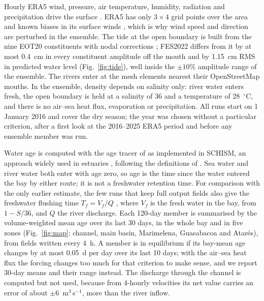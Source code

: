 \documentclass[a4paper,fleqn]{ems-dc}
\begin{document}
Hourly ERA5 wind, pressure, air temperature, humidity, radiation and precipitation drive the
surface \citep{Hersbach2020}. ERA5 has only $3 \times 4$ grid points over the area and known
biases in its surface winds \citep{BelmonteRivas2019}, which is why wind speed and direction
are perturbed in the ensemble. The tide at the open boundary is built from the nine EOT20
constituents with nodal corrections \citep{Pugh2014}; FES2022 differs from it by at most
0.4~cm in every constituent amplitude off the mouth and by 1.15~cm RMS in predicted water
level (Fig.~\ref{fig:tide}), well inside the $\pm10\%$ amplitude range of the ensemble. The
rivers enter at the mesh elements nearest their OpenStreetMap mouths. In the ensemble,
density depends on salinity only: river water enters fresh, the open boundary is held at a
salinity of 36 and a temperature of 28~$^\circ$C, and there is no air--sea heat flux,
evaporation or precipitation. All runs start on 1 January 2016 and cover the dry season; the
year was chosen without a particular criterion, after a first look at the 2016--2025 ERA5
period and before any ensemble member was run.

Water age is computed with the age tracer of \citet{Deleersnijder2001} \citep[see
also][]{Delhez1999} as implemented in SCHISM, an approach widely used in estuaries
\citep{Shen2004}, following the definitions of \citet{Monsen2002}. Sea water and river water
both enter with age zero, so age is the time since the water entered the bay by either
route; it is not a freshwater retention time. For comparison with the only earlier estimate,
the few runs that keep full output fields also give the freshwater flushing time
$T_f = V_f/Q$ \citep{Alber1999,Sheldon2002}, where $V_f$ is the fresh water in the bay, from
$1 - S/36$, and $Q$ the river discharge. Each 120-day member is summarised by the
volume-weighted mean age over its last 30 days, in the whole bay and in five zones
(Fig.~\ref{fig:map}: channel, main basin, Marimelena, Guasabacoa and Atar\'es), from fields
written every 4~h. A member is in equilibrium if its bay-mean age changes by at most 0.05~d per day over
its last 10 days; with the air--sea heat flux the forcing changes too much for that
criterion to make sense, and we report 30-day means and their range instead. The discharge
through the channel is computed but not used, because from 4-hourly velocities its net value
carries an error of about $\pm 6$~m$^3$\,s$^{-1}$, more than the river inflow.
\end{document}
